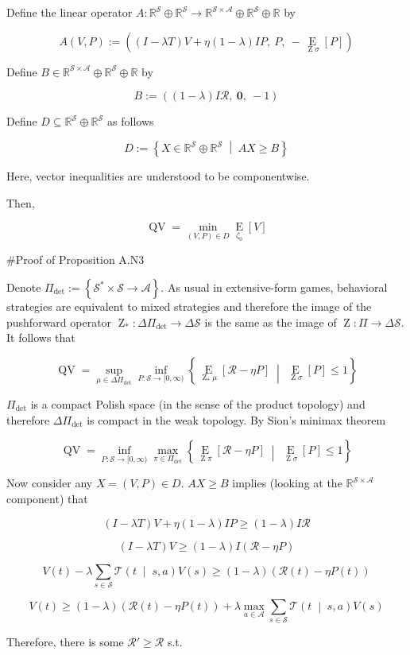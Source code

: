 \documentclass[a4paper]{article}
\newcommand{\AP}[1]{\left(#1\right)}
\newcommand{\AB}[1]{\left[#1\right]}
\newcommand{\AC}[1]{\left\{#1\right\}}
\newcommand{\APM}[2]{\left(#1\;\middle\vert\;#2\right)}
\newcommand{\ACM}[2]{\left\{#1\;\middle\vert\;#2\right\}}
\newcommand{\Ea}[2]{\underset{#1}{\operatorname{E}}\AB{#2}}
\newcommand{\Reals}{\mathbb{R}}
\newcommand{\A}{\mathcal{A}}
\newcommand{\St}{\mathcal{S}}
\newcommand{\T}{\mathcal{T}}
\newcommand{\R}{\mathcal{R}}
\newcommand{\Pe}{P}
\newcommand{\QV}{\operatorname{QV}}
\DeclareMathOperator{\Z}{Z}
\begin{document}
Define the linear operator $A: \Reals^\St \oplus \Reals^\St \rightarrow \Reals^{\St\times\A}\oplus\Reals^{\St}\oplus\Reals$ by

$$A(V,P):=\AP{\AP{I-\lambda T}V + \eta(1-\lambda)IP,\ P,\ -\Ea{\Z\sigma}{P}}$$

Define $B\in \Reals^{\St\times\A}\oplus\Reals^{\St}\oplus\Reals$ by

$$B:=\AP{(1-\lambda)I\R,\ \boldsymbol{0},\ -1}$$

Define $D \subseteq \Reals^\St \oplus \Reals^\St$ as follows

$$D:=\ACM{X \in \Reals^\St \oplus \Reals^\St}{AX \geq B}$$

Here, vector inequalities are understood to be componentwise.

Then,

$$\QV = \min_{(V,P)\in D}{\Ea{\zeta_0}{V}}$$

\#Proof of Proposition A.N3

Denote $\Pi_{\det}:=\AC{\St^* \times \St \rightarrow \A}$. As usual in extensive-form games, behavioral strategies are equivalent to mixed strategies and therefore the image of the pushforward operator $\Z_*: \Delta\Pi_{\det} \rightarrow \Delta\St$ is the same as the image of $\Z: \Pi \rightarrow \Delta\St$. It follows that

$$\QV = \sup_{\mu \in \Delta\Pi_{\det}}\inf_{\Pe:\St\rightarrow[0,\infty)}\ACM{\Ea{\Z_*\mu}{\R-\eta\Pe}}{\Ea{\Z\sigma}{\Pe}\leq1}$$

$\Pi_{\det}$ is a compact Polish space (in the sense of the product topology) and therefore $\Delta\Pi_{\det}$ is compact in the weak topology. By Sion's minimax theorem

$$\QV = \inf_{\Pe:\St\rightarrow[0,\infty)}\max_{\pi \in \Pi_{\det}}\ACM{\Ea{\Z\pi}{\R-\eta\Pe}}{\Ea{\Z\sigma}{\Pe}\leq1}$$

Now consider any $X=(V,P) \in D$. $AX \geq B$ implies (looking at the $\Reals^{\St\times\A}$ component) that

$$\AP{I-\lambda T}V + \eta(1-\lambda)IP \geq (1-\lambda)I\R$$

$$\AP{I-\lambda T}V\geq (1-\lambda)I(\R-\eta P)$$

$$V(t) - \lambda \sum_{s \in \St} \T\APM{t}{s,a} V(s) \geq (1-\lambda)\AP{\R(t)-\eta P(t)}$$

$$V(t) \geq (1-\lambda)\AP{\R(t)-\eta P(t)} + \lambda \max_{a \in \A } \sum_{s \in \St} \T\APM{t}{s,a} V(s)$$

Therefore, there is some $\R' \geq \R$ s.t.
\end{document}
